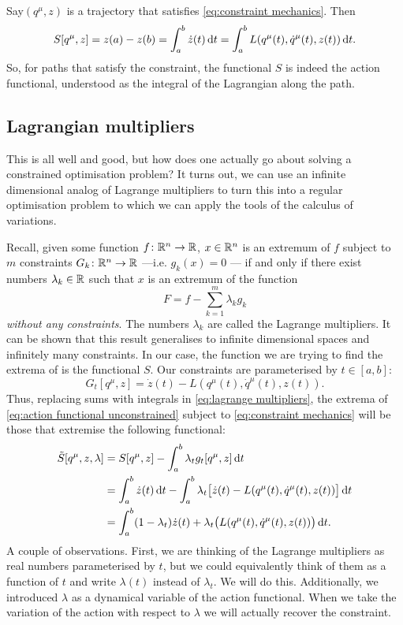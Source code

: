 \documentclass[../main.tex]{subfiles}
\begin{document}
Say\( (q^\mu, z) \) is a trajectory that satisfies \cref{eq:constraint mechanics}. Then 
\begin{equation*}
	S[q^\mu, z] = z(a) - z(b) = \int_a^b \dot{z}(t) \,\mathrm{d} t = \int_a^b L(q^\mu(t),
	\dot{q}^\mu(t), z(t)) \,\mathrm{d} t. 
\end{equation*}
So, for paths that satisfy the constraint, the functional \( S \) is indeed the
action functional, understood as the integral of the Lagrangian along the path.

\subsection{Lagrangian multipliers}
This is all well and good, but how does one actually go about solving a constrained
optimisation problem? It turns out, we can use an infinite dimensional analog of Lagrange
multipliers to turn this into a regular optimisation problem to which we can apply the
tools of the calculus of variations. 

Recall, given some function \( f \colon \mathbb{R}^n \to \mathbb{R} \), \( x \in \mathbb{R}^n \) is an extremum of
\( f \) subject to \( m \) constraints \( G_k \colon \mathbb{R}^n \to \mathbb{R} \) ---i.e. \( g_k(x) = 0
\) --- if and only if there exist numbers \( \lambda_k \in \mathbb{R} \) such that
\( x \) is an extremum of the function
\begin{equation} \label{eq:lagrange multipliers}
	 F = f - \sum_{k = 1}^{m}\lambda_k g_k 
\end{equation}
\emph{without any constraints}. The numbers \( \lambda_k \) are called the Lagrange
multipliers. It can be shown that this result generalises to infinite dimensional spaces
and infinitely many constraints. In our case, the function we are trying to find the
extrema of is the functional \( S \). Our constraints are parameterised by \( t \in [a,b]
\):
\begin{equation*}
	G_t[q^\mu, z] = \dot{z}(t) - L(q^\mu(t), \dot{q}^\mu(t), z(t)).
\end{equation*}
Thus, replacing sums with integrals in \cref{eq:lagrange multipliers}, the extrema of
\cref{eq:action functional unconstrained} subject to \cref{eq:constraint mechanics} will
be those that extremise the following functional: 
\begin{align} \label{eq:lagrange multiplier action}
	\tilde{S}[q^\mu, z, \lambda] & = S[q^\mu, z] - \int_a^b \lambda_t g_t[q^\mu, z] \,\mathrm{d} t
	\nonumber \\
															 & = \int_a^b \dot{z}(t) \,\mathrm{d} t - \int_a^b \lambda_t\big[\dot{z}(t) -
		L(q^\mu(t), \dot{q}^\mu(t), z(t))\big] \,\mathrm{d} t \nonumber \\ & = \int_a^b (1 - \lambda_t)
		\dot{z}(t) + \lambda_t\big(L(q^\mu(t), \dot{q}^\mu(t), z(t))\big) \,\mathrm{d} t.
\end{align}
A couple of observations. First, we are thinking of the Lagrange multipliers as real
numbers parameterised by \( t \), but we could equivalently think of them as a function of
\( t \) and write \( \lambda(t) \) instead of \( \lambda_t \). We will do this.
Additionally, we introduced \( \lambda \) as a dynamical variable of the action
functional. When we take the variation of the action with respect to \( \lambda \) we will
actually recover the constraint. 
\end{document}
